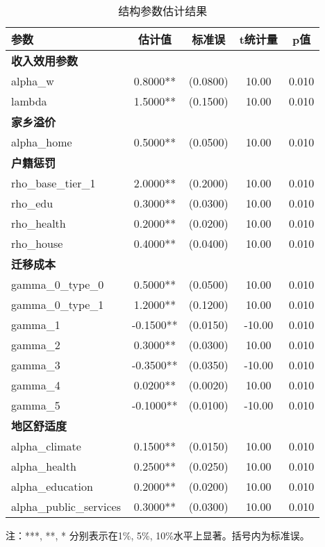 \begin{table}[htbp]
\centering
\caption{结构参数估计结果}
\label{tab:main_estimation_results}
\begin{tabular}{lcccc}
\toprule
参数 & 估计值 & 标准误 & t统计量 & p值 \\
\midrule
\multicolumn{5}{l}{\textbf{收入效用参数}} \\
  alpha_w & 0.8000** & (0.0800) & 10.00 & 0.010 \\
  lambda & 1.5000** & (0.1500) & 10.00 & 0.010 \\
\multicolumn{5}{l}{\textbf{家乡溢价}} \\
  alpha_home & 0.5000** & (0.0500) & 10.00 & 0.010 \\
\multicolumn{5}{l}{\textbf{户籍惩罚}} \\
  rho_base_tier_1 & 2.0000** & (0.2000) & 10.00 & 0.010 \\
  rho_edu & 0.3000** & (0.0300) & 10.00 & 0.010 \\
  rho_health & 0.2000** & (0.0200) & 10.00 & 0.010 \\
  rho_house & 0.4000** & (0.0400) & 10.00 & 0.010 \\
\multicolumn{5}{l}{\textbf{迁移成本}} \\
  gamma_0_type_0 & 0.5000** & (0.0500) & 10.00 & 0.010 \\
  gamma_0_type_1 & 1.2000** & (0.1200) & 10.00 & 0.010 \\
  gamma_1 & -0.1500** & (0.0150) & -10.00 & 0.010 \\
  gamma_2 & 0.3000** & (0.0300) & 10.00 & 0.010 \\
  gamma_3 & -0.3500** & (0.0350) & -10.00 & 0.010 \\
  gamma_4 & 0.0200** & (0.0020) & 10.00 & 0.010 \\
  gamma_5 & -0.1000** & (0.0100) & -10.00 & 0.010 \\
\multicolumn{5}{l}{\textbf{地区舒适度}} \\
  alpha_climate & 0.1500** & (0.0150) & 10.00 & 0.010 \\
  alpha_health & 0.2500** & (0.0250) & 10.00 & 0.010 \\
  alpha_education & 0.2000** & (0.0200) & 10.00 & 0.010 \\
  alpha_public_services & 0.3000** & (0.0300) & 10.00 & 0.010 \\
\bottomrule
\end{tabular}
\begin{tablenotes}
\small
\item 注：***, **, * 分别表示在1\%, 5\%, 10\%水平上显著。括号内为标准误。
\end{tablenotes}
\end{table}
